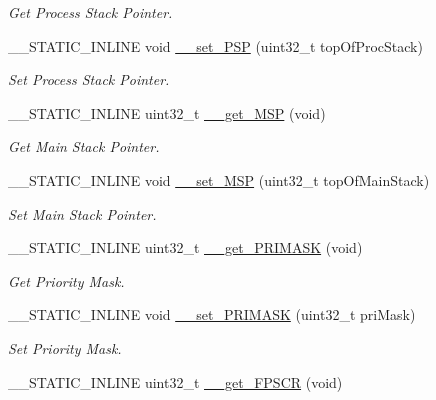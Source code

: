 \begin{DoxyCompactItemize}
\begin{DoxyCompactList}\small\item\em Get Process Stack Pointer. \end{DoxyCompactList}\item 
\+\_\+\+\_\+\+S\+T\+A\+T\+I\+C\+\_\+\+I\+N\+L\+I\+NE void \hyperlink{group___c_m_s_i_s___core___reg_acc_functions_ga21f50fc02c3927a8ebf0bc3678c06862}{\+\_\+\+\_\+set\+\_\+\+P\+SP} (uint32\+\_\+t top\+Of\+Proc\+Stack)
\begin{DoxyCompactList}\small\item\em Set Process Stack Pointer. \end{DoxyCompactList}\item 
\+\_\+\+\_\+\+S\+T\+A\+T\+I\+C\+\_\+\+I\+N\+L\+I\+NE uint32\+\_\+t \hyperlink{group___c_m_s_i_s___core___reg_acc_functions_ga667e7b8b97b4a30f445ae45d37588e45}{\+\_\+\+\_\+get\+\_\+\+M\+SP} (void)
\begin{DoxyCompactList}\small\item\em Get Main Stack Pointer. \end{DoxyCompactList}\item 
\+\_\+\+\_\+\+S\+T\+A\+T\+I\+C\+\_\+\+I\+N\+L\+I\+NE void \hyperlink{group___c_m_s_i_s___core___reg_acc_functions_ga08b66e2b60a46fada36d90d2bc1e7c9b}{\+\_\+\+\_\+set\+\_\+\+M\+SP} (uint32\+\_\+t top\+Of\+Main\+Stack)
\begin{DoxyCompactList}\small\item\em Set Main Stack Pointer. \end{DoxyCompactList}\item 
\+\_\+\+\_\+\+S\+T\+A\+T\+I\+C\+\_\+\+I\+N\+L\+I\+NE uint32\+\_\+t \hyperlink{group___c_m_s_i_s___core___reg_acc_functions_ga4ff59fb9e280d19e79e6875863a65f0a}{\+\_\+\+\_\+get\+\_\+\+P\+R\+I\+M\+A\+SK} (void)
\begin{DoxyCompactList}\small\item\em Get Priority Mask. \end{DoxyCompactList}\item 
\+\_\+\+\_\+\+S\+T\+A\+T\+I\+C\+\_\+\+I\+N\+L\+I\+NE void \hyperlink{group___c_m_s_i_s___core___reg_acc_functions_gaf4a17d3be7dbb066489836d849930d92}{\+\_\+\+\_\+set\+\_\+\+P\+R\+I\+M\+A\+SK} (uint32\+\_\+t pri\+Mask)
\begin{DoxyCompactList}\small\item\em Set Priority Mask. \end{DoxyCompactList}\item 
\+\_\+\+\_\+\+S\+T\+A\+T\+I\+C\+\_\+\+I\+N\+L\+I\+NE uint32\+\_\+t \hyperlink{group___c_m_s_i_s___core___reg_acc_functions_ga6a275172e274ea7ce6c22030d07c6c64}{\+\_\+\+\_\+get\+\_\+\+F\+P\+S\+CR} (void)

\end{DoxyCompactItemize}

